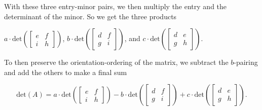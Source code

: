 \documentclass{ximera}
\begin{document}
With these three entry-minor pairs, we then multiply the entry and the determinant of the minor. So we get the three products

$a\cdot\mbox{det}\left(\begin{bmatrix}
    e&f\\i&h
\end{bmatrix}\right)$, $b\cdot \mbox{det}\left(\begin{bmatrix}
    d&f\\g&i
\end{bmatrix}\right)$, and $c\cdot \mbox{det}\left(\begin{bmatrix}
    d&e\\g&h
\end{bmatrix}\right)$.

To then preserve the orientation-ordering of the matrix, we subtract the $b$-pairing and add the others to make a final sum 

$$\mbox{det}(A)=a\cdot\mbox{det}\left(\begin{bmatrix}
    e&f\\i&h
\end{bmatrix}\right)-b\cdot \mbox{det}\left(\begin{bmatrix}
    d&f\\g&i
\end{bmatrix}\right)+c\cdot \mbox{det}\left(\begin{bmatrix}
    d&e\\g&h
\end{bmatrix}\right).$$
\end{document}
